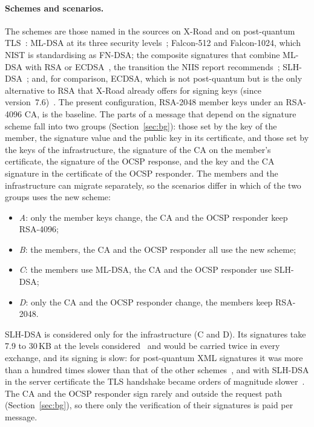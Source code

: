 \documentclass[conference,a4paper]{IEEEtran}
\newcommand{\newtext}[1]{{\color{blue}#1}}
\begin{document}
{\paragraph{Schemes and scenarios.} The schemes are those named in the sources on X-Road and on
post-quantum TLS~\cite{bakhtina2026pqc,snetkov2023,paquin2020,sikeridis2020}: ML-DSA at its three
security levels~\cite{fips204}; Falcon-512 and Falcon-1024, which NIST is standardising as FN-DSA; the
composite signatures that combine ML-DSA with RSA or ECDSA~\cite{rfc10073}, the transition the NIIS
report recommends~\cite{bakhtina2026pqc}; SLH-DSA~\cite{fips205}; and\newtext{, for comparison, ECDSA, which is not
post-quantum but is the only alternative to RSA that X-Road already offers for signing keys (since
version~7.6)~\cite{xroadsyspar}}. The present configuration, RSA-2048 member keys under an
RSA-4096 CA, is the baseline. The parts of a message that depend on the signature scheme fall into
two groups (Section~\ref{sec:bg}): those set by the key of the member, the signature value and the
public key in its certificate, and those set by the keys of the infrastructure, the signature of
the CA on the member's certificate, the signature of the OCSP response, and the key and the CA
signature in the certificate of the OCSP responder. The members and the infrastructure can migrate
separately, so the scenarios differ in which of the two groups uses the new scheme:
\begin{itemize}
  \item \emph{A}: only the member keys change, the CA and the OCSP responder keep RSA-4096;
  \item \emph{B}: the members, the CA and the OCSP responder all use the new scheme;
  \item \emph{C}: the members use ML-DSA, the CA and the OCSP responder use SLH-DSA;
  \item \emph{D}: only the CA and the OCSP responder change, the members keep RSA-2048.
\end{itemize}
SLH-DSA is considered only for the infrastructure (C and D). Its signatures take 7.9 to 30\,KB at the
levels considered~\cite{fips205} and would be carried twice in every exchange, and its signing is
slow: for post-quantum XML signatures it was more than a hundred times slower than that of the other
schemes~\cite{mueller2024}, and with SLH-DSA in the server certificate the TLS handshake became
orders of magnitude slower~\cite{delgado2026}. The CA and the OCSP responder sign rarely and outside
the request path (Section~\ref{sec:bg}), so there only the verification of their signatures is paid
per message.

}
\end{document}
